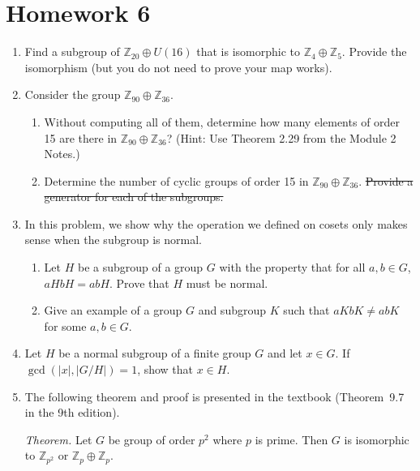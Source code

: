 \documentclass{article}
\newcommand{\ZZ}{\mathbb{Z}}
\begin{document}
\section*{Homework 6}


\begin{enumerate}

\item Find a subgroup of $\ZZ_{20} \oplus U(16)$ that is isomorphic to $\ZZ_4\oplus\ZZ_5$. Provide the isomorphism (but you do not need to prove your map works).

    
\item Consider the group $\ZZ_{90}\oplus\ZZ_{36}$.
    \begin{enumerate}
        \item Without computing all of them, determine how many elements of order 15 are there in $\ZZ_{90}\oplus\ZZ_{36}$? (Hint: Use Theorem 2.29 from the Module 2 Notes.)
        
        
        \item Determine the number of cyclic groups of order 15 in $\ZZ_{90}\oplus\ZZ_{36}$. {\color{red}\st{Provide a generator for each of the subgroups.}}

    \end{enumerate}
    
    
\item In this problem, we show why the operation we defined on cosets only makes sense when the subgroup is normal. 
    \begin{enumerate} 
        \item Let $H$ be a subgroup of a group $G$ with the property that for all $a,b\in G$, $aHbH=abH$. Prove that $H$ must be normal.
        
    
        \item Give an example of a group $G$ and subgroup $K$ such that $aKbK\ne abK$ for some $a,b\in G$. 
        
    \end{enumerate} 
    
    
\item Let $H$ be a normal subgroup of a finite group $G$ and let $x\in G$. If $\gcd(|x|, |G/H|)=1$, show that $x\in H$.
    
    
\item The following theorem and proof is presented in the textbook (Theorem~9.7 in the 9th edition).
    
    \bigskip
    {\sffamily
    \textit{Theorem. }
    Let $G$ be group of order $p^2$ where $p$ is prime. Then $G$ is isomorphic to $\ZZ_{p^2}$ or $\ZZ_p\oplus \ZZ_p$.

}
\end{enumerate}
\end{document}
